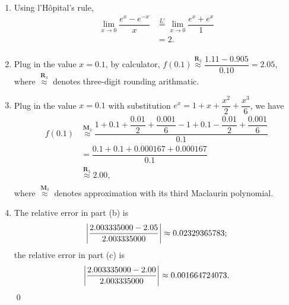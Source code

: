 \documentclass[11pt]{article}
\theoremstyle{break}
\numberwithin{equation}{theorem}
\begin{document}
\begin{enumerate}
    \item Using l'Hôpital's rule, \vspace{-0.6em}
    \begin{align*}
        \lim_{x\to 0}\dfrac{e^x-e^{-x}}{x}&\overset{L'}{=}\lim_{x\to 0}\dfrac{e^x+e^x}{1}\\
        &=2.\\[-3.4em]
    \end{align*}
    \item Plug in the value $x=0.1$, by calculator, $f(0.1)\overset{\textbf{R}_3}{\approx}\dfrac{1.11-0.905}{0.10}=2.05$, where $\overset{\textbf{R}_3}{\approx}$ denotes three-digit rounding arithmatic.
    \item Plug in the value $x=0.1$ with substitution $e^x=1+x+\dfrac{x^2}{2}+\dfrac{x^3}{6}$, we have \vspace{-0.6em}
    \begin{align*}
        f(0.1)&\overset{\textbf{M}_{3}}{\approx}\dfrac{1+0.1+\dfrac{0.01}{2}+\dfrac{0.001}{6}-1+0.1-\dfrac{0.01}{2}+\dfrac{0.001}{6}}{0.1}\\
        &=\dfrac{0.1+0.1+0.000167+0.000167}{0.1}\\
        &\overset{\textbf{R}_3}{\approx}2.00,\\[-3.4em]
    \end{align*}
    where $\overset{\textbf{M}_{3}}{\approx}$ denotes approximation with its third Maclaurin polynomial.
    \item The relative error in part (b) is \vspace{-0.6em}
    \begin{equation*}
        \left|\dfrac{2.003335000-2.05}{2.003335000}\right|\approx0.02329365783; \vspace{-0.6em}
    \end{equation*}
    the relative error in part (c) is \vspace{-0.6em}
    \begin{equation*}
        \left|\dfrac{2.003335000-2.00}{2.003335000}\right|\approx0.001664724073. \vspace{-0.6em}
    \end{equation*}
    \qed
\end{enumerate}
\end{document}
